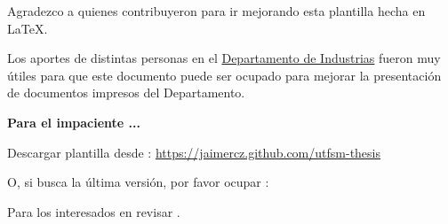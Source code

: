 
	Agradezco a quienes contribuyeron para ir mejorando esta plantilla hecha en \LaTeX{}. 
    
    Los aportes de distintas personas en el \href{http://www.industrias.usm.cl}{Departamento de Industrias} fueron muy útiles para que este documento puede ser ocupado para mejorar la presentación de documentos impresos del Departamento.


\vspace{20mm}
\begin{framed}
\noindent\textbf{\color{red}Para el impaciente ...}

Descargar plantilla desde : \url{https://jaimercz.github.com/utfsm-thesis}
	
    
\noindent O, si busca la última versión, por favor ocupar :


Para los interesados en  revisar \citet{git2016}.


\end{framed}